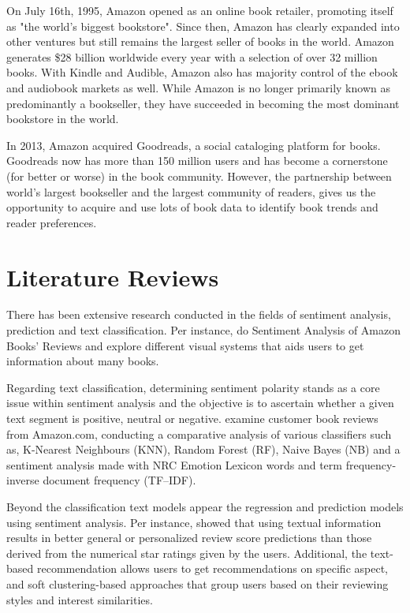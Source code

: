 \documentclass[12pt]{article}
\numberwithin{equation}{section}
\begin{document}
On July 16th, 1995, Amazon opened as an online book retailer, promoting itself as "the world's biggest bookstore". Since then, Amazon has clearly expanded into other ventures but still remains the largest seller of books in the world. Amazon generates \$28 billion worldwide every year with a selection of over 32 million books. With Kindle and Audible, Amazon also has majority control of the ebook and audiobook markets as well. While Amazon is no longer primarily known as predominantly a bookseller, they have succeeded in becoming the most dominant bookstore in the world.

In 2013, Amazon acquired Goodreads, a social cataloging platform for books. Goodreads now has more than 150 million users and has become a cornerstone (for better or worse) in the book community. However, the partnership between world's largest bookseller and the largest community of readers, gives us the opportunity to acquire and use lots of book data to identify book trends and reader preferences.

\section{Literature Reviews}

There has been extensive research conducted in the fields of sentiment analysis, prediction and text classification. Per instance, \citet{Almjawel2019} do Sentiment Analysis of  Amazon Books' Reviews and explore different visual systems that aids users to get information about many books. 

Regarding text classification, determining sentiment polarity stands as a core issue within sentiment analysis and the objective is to ascertain whether a given text segment is positive, neutral or negative. \citet{Srujan2018} examine customer book reviews from Amazon.com, conducting a comparative analysis of various classifiers such as, K-Nearest Neighbours (KNN), Random Forest (RF), Naive Bayes (NB) and a sentiment analysis made with NRC Emotion Lexicon words and term frequency-inverse document frequency (TF–IDF).

Beyond the classification text models appear the regression and prediction models using sentiment analysis. Per instance, \cite{Ganu2009} showed that using textual information results in better general or personalized review score predictions than those derived from the numerical star ratings given by the users. Additional, the text-based recommendation allows users to get recommendations on specific aspect, and soft clustering-based approaches that group users based on their reviewing styles and interest similarities.
\end{document}
